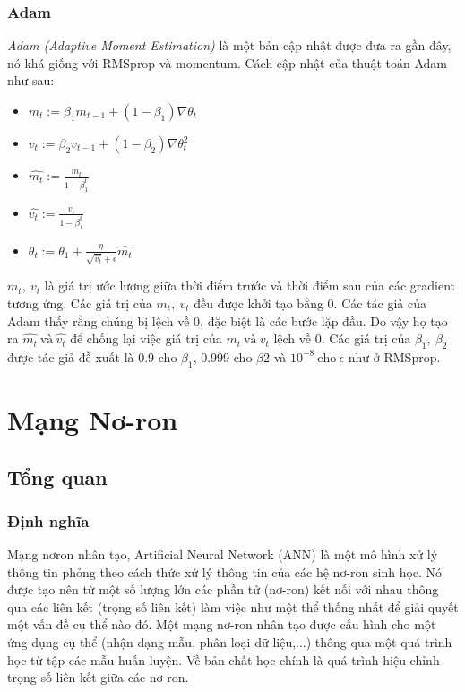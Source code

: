 \subsection{Adam}
 \textit{Adam (Adaptive Moment Estimation)} là một bản cập nhật được đưa ra gần đây, nó khá giống với RMSprop và momentum. Cách cập nhật của thuật toán Adam như sau:
\begin{itemize}
\item[]  $m_t := \beta_1 m_{t-1} + (1-\beta_1) \nabla\theta_{t}$
\item[] $v_t := \beta_2 v_{t-1} + (1-\beta_2) \nabla\theta^2_{t}$
\item[] $ \widehat{m_t} := \frac{m_t}{1-\beta_1^{t}}$
\item[] $ \widehat{v_t} := \frac{v_t}{1-\beta_1^{t}} $
\item[] $\theta_t := \theta_1 + \frac{\eta }{\sqrt{\widehat{v_t}} +\epsilon}\widehat{m_t}$ 
\end{itemize}
$m_t,~v_t$ là giá trị ước lượng giữa thời điểm trước và thời điểm sau của các gradient tương ứng. Các giá trị của $m_t,~v_t$ đều được khởi tạo bằng 0. Các tác giả của Adam thấy rằng chúng bị lệch về 0, đặc biệt là các bước lặp đầu. Do vậy họ tạo ra $\widehat{m_t}~\text{và}~\widehat{v_t}$ để chống lại việc giá trị của $m_t ~\text{và}~ v_t$ lệch về 0. Các giá trị của $\beta_1,~\beta_2$ được tác giả đề xuất là 0.9 cho $\beta_1$, 0.999 cho $\beta2$  và $10^{-8} ~\text{cho}~ \epsilon$ như ở RMSprop.

\chapter{Mạng Nơ-ron}
\section{Tổng quan}
\subsection{Định nghĩa}
Mạng nơron nhân tạo, Artificial Neural Network (ANN) là một mô hình xử lý thông tin phỏng theo cách thức xử lý thông tin của các hệ nơ-ron sinh học. Nó được tạo nên từ một số lượng lớn các phần tử (nơ-ron) kết nối với nhau thông qua các liên kết (trọng số liên kết) làm việc như một thể thống nhất để giải quyết một vấn đề cụ thể nào đó. Một mạng nơ-ron nhân tạo được cấu hình cho một ứng dụng cụ thể (nhận dạng mẫu, phân loại dữ liệu,...) thông qua một quá trình học từ tập các mẫu huấn luyện. Về bản chất học chính là quá trình hiệu chỉnh trọng số liên kết giữa các nơ-ron.

